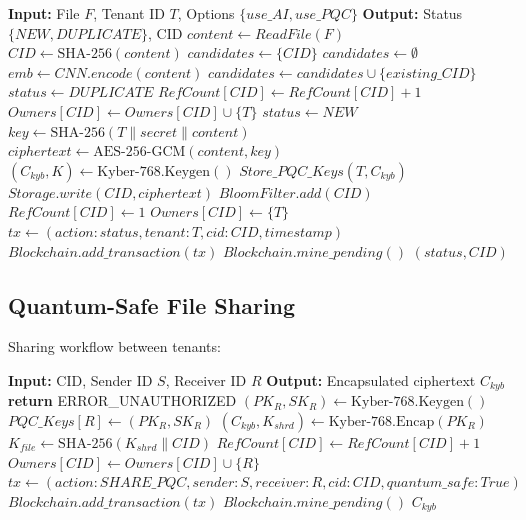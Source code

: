 \documentclass[conference]{IEEEtran}
\begin{document}
\begin{algorithmic}
\STATE \textbf{Input:} File $F$, Tenant ID $T$, Options $\{use\_AI, use\_PQC\}$
\STATE \textbf{Output:} Status $\{NEW, DUPLICATE\}$, CID
\STATE
\STATE $content \gets ReadFile(F)$
\STATE $CID \gets \text{SHA-256}(content)$
\STATE
{}
    \STATE $candidates \gets \{CID\}$
\ELSE
    \STATE $candidates \gets \emptyset$
\ENDIF
\STATE
{}
    \STATE $emb \gets CNN.encode(content)$
            \STATE $candidates \gets candidates \cup \{existing\_CID\}$
        \ENDIF
    \ENDFOR
\ENDIF
\STATE
{}
    \STATE $status \gets DUPLICATE$
    \STATE $RefCount[CID] \gets RefCount[CID] + 1$
    \STATE $Owners[CID] \gets Owners[CID] \cup \{T\}$
\ELSE
    \STATE $status \gets NEW$
    \STATE $key \gets \text{SHA-256}(T \parallel secret \parallel content)$
    \STATE $ciphertext \gets \text{AES-256-GCM}(content, key)$
        \STATE $(C_{kyb}, K) \gets \text{Kyber-768.Keygen}()$
        \STATE $Store\_PQC\_Keys(T, C_{kyb})$
    \ENDIF
    \STATE $Storage.write(CID, ciphertext)$
    \STATE $BloomFilter.add(CID)$
    \STATE $RefCount[CID] \gets 1$
    \STATE $Owners[CID] \gets \{T\}$
\ENDIF
\STATE
\STATE $tx \gets (action: status, tenant: T, cid: CID, timestamp)$
\STATE $Blockchain.add\_transaction(tx)$
\STATE $Blockchain.mine\_pending()$
\STATE
\RETURN $(status, CID)$
\end{algorithmic}

\subsection{Quantum-Safe File Sharing}
Sharing workflow between tenants:

\begin{algorithmic}
\STATE \textbf{Input:} CID, Sender ID $S$, Receiver ID $R$
\STATE \textbf{Output:} Encapsulated ciphertext $C_{kyb}$
\STATE
{}
    \STATE \textbf{return} ERROR\_UNAUTHORIZED
\ENDIF
\STATE
{}
    \STATE $(PK_R, SK_R) \gets \text{Kyber-768.Keygen}()$
    \STATE $PQC\_Keys[R] \gets (PK_R, SK_R)$
\ENDIF
\STATE
\STATE $(C_{kyb}, K_{shrd}) \gets \text{Kyber-768.Encap}(PK_R)$
\STATE $K_{file} \gets \text{SHA-256}(K_{shrd} \parallel CID)$
\STATE
\STATE $RefCount[CID] \gets RefCount[CID] + 1$
\STATE $Owners[CID] \gets Owners[CID] \cup \{R\}$
\STATE
\STATE $tx \gets (action: SHARE\_PQC, sender: S, receiver: R, cid: CID, quantum\_safe: True)$
\STATE $Blockchain.add\_transaction(tx)$
\STATE $Blockchain.mine\_pending()$
\STATE
\RETURN $C_{kyb}$
\end{algorithmic}
\end{document}
